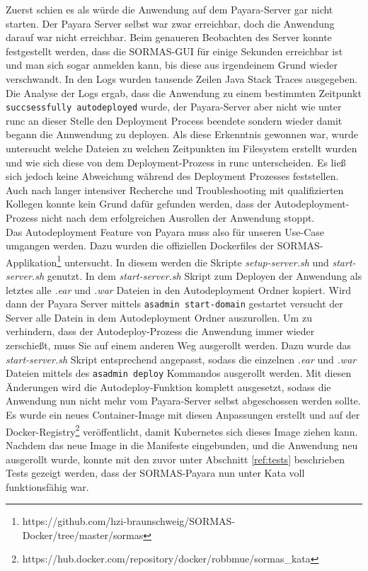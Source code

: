 Zuerst schien es als würde die Anwendung auf dem Payara-Server gar nicht starten. 
Der Payara Server selbst war zwar erreichbar, doch die Anwendung darauf war nicht erreichbar.
Beim genaueren Beobachten des Server konnte festgestellt werden, dass die \ac{SORMAS}-\ac{GUI} für einige Sekunden erreichbar ist und man sich sogar anmelden kann, bis diese aus irgendeinem Grund wieder verschwandt.
In den Logs wurden tausende Zeilen Java Stack Traces ausgegeben. 
Die Analyse der Logs ergab, dass die Anwendung zu einem bestimmten Zeitpunkt \texttt{succsessfully autodeployed} wurde, der Payara-Server aber nicht wie unter runc an dieser Stelle den Deployment Process beendete sondern wieder damit begann die Annwendung zu deployen.
Als diese Erkenntnis gewonnen war, wurde untersucht welche Dateien zu welchen Zeitpunkten im Filesystem erstellt wurden und wie sich diese von dem Deployment-Prozess in runc unterscheiden. 
Es ließ sich jedoch keine Abweichung während des Deployment Prozesses feststellen.
Auch nach langer intensiver Recherche und Troubleshooting mit qualifizierten Kollegen konnte kein Grund dafür gefunden werden, dass der Autodeployment-Prozess nicht nach dem erfolgreichen Ausrollen der Anwendung stoppt. 
\\
Das Autodeployment Feature von Payara muss also für unseren Use-Case umgangen werden. 
Dazu wurden die offiziellen Dockerfiles der \ac{SORMAS}-Applikation\footnote{https://github.com/hzi-braunschweig/SORMAS-Docker/tree/master/sormas} untersucht. 
In diesem werden die Skripte \textit{setup-server.sh} und \textit{start-server.sh} genutzt.
In dem \textit{start-server.sh} Skript zum Deployen der Anwendung als letztes alle \textit{.ear} und \textit{.war} Dateien in den Autodeployment Ordner kopiert.
Wird dann der Payara Server mittels \texttt{asadmin start-domain} gestartet versucht der Server alle Datein in dem Autodeployment Ordner auszurollen.
Um zu verhindern, dass der Autodeploy-Prozess die Anwendung immer wieder zerschießt, muss Sie auf einem anderen Weg ausgerollt werden.
Dazu wurde das \textit{start-server.sh} Skript entsprechend angepasst, sodass die einzelnen \textit{.ear} und \textit{.war} Dateien mittels des \texttt{asadmin deploy} Kommandos ausgerollt werden.
Mit diesen Änderungen wird die Autodeploy-Funktion komplett ausgesetzt, sodass die Anwendung nun nicht mehr vom Payara-Server selbst abgeschossen werden sollte.
Es wurde ein neues Container-Image mit diesen Anpassungen erstellt und auf der Docker-Registry\footnote{https://hub.docker.com/repository/docker/robbmue/sormas\_kata} veröffentlicht, damit Kubernetes sich dieses Image ziehen kann.
Nachdem das neue Image in die Manifeste eingebunden, und die Anwendung neu ausgerollt wurde, konnte mit den zuvor unter Abschnitt \ref{ref:tests} beschrieben Tests gezeigt werden, dass der \ac{SORMAS}-Payara nun unter Kata voll funktionsfähig war.


